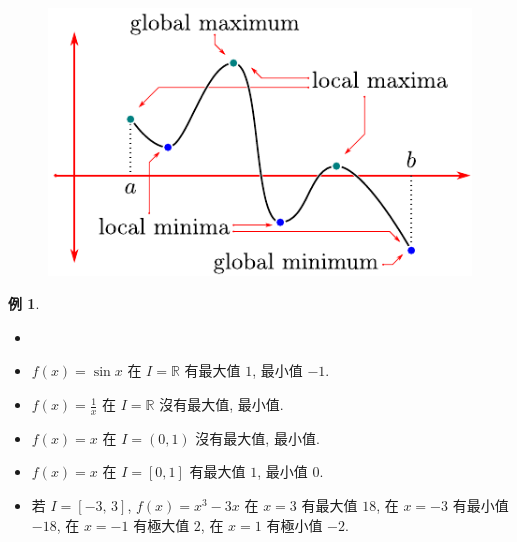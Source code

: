 \documentclass[12pt]{extarticle}
\newcommand{\ds}{\displaystyle}
\theoremstyle{definition}
\newtheorem*{ex}{例}
\begin{document}
\begin{figure}[!htbp]
  \centering
  \includegraphics[scale=1,page=1]{fig/maxmin3.pdf}
  \hspace{25mm}
\end{figure}

\begin{ex}
  \begin{itemize}\setlength\itemsep{0em}
    \item[]
    \item $\ds f(x) = \sin x$ 在 $I = \mathbb{R}$ 有最大值 $1$, 最小值 $-1$. 
    \item $\ds f(x) = \frac{1}{x}$ 在 $I = \mathbb{R}$ 沒有最大值, 最小值. 
    \item $\ds f(x) = x$ 在 $I = (0, 1)$ 沒有最大值, 最小值. 
    \item $\ds f(x) = x$ 在 $I = [0, 1]$ 有最大值 $1$, 最小值 $0$. 
    \item 若 $I = [-3,\,3]$, $\ds f(x) = x^3 - 3x$ 在 $x = 3$ 有最大值 $18$, 在 $x = -3$ 有最小值 $-18$, 在 $x = -1$ 有極大值 $2$, 在 $x = 1$ 有極小值 $-2$. 
  \end{itemize}
\end{ex}
\end{document}
